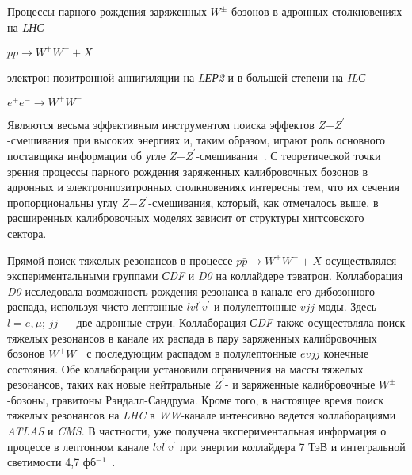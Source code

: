 Процессы парного рождения заряженных $W^±$-бозонов в адронных столкновениях на \textit{LНС}
\begin{center}
	$pp \rightarrow W^+W^- + X$
\end{center}
электрон-позитронной аннигиляции на \textit{LЕР2} и в большей степени на \textit{ILС}
\begin{center}
	$e^+e^- \rightarrow W^+W^-$
\end{center}

Являются весьма эффективным инструментом поиска эффектов $Z$−$Z^\prime$-смешивания при высоких энергиях и, таким образом, играют роль основного поставщика информации об угле $Z$−$Z^\prime$-смешивания~\cite{Bobovnikov:2016}. С теоретической точки зрения процессы парного рождения заряженных калибровочных бозонов в адронных и электронпозитронных столкновениях интересны тем, что их сечения пропорциональны углу $Z$−$Z^\prime$-смешивания, который, как отмечалось выше, в расширенных калибровочных моделях зависит от структуры хиггсовского сектора.

Прямой поиск тяжелых резонансов в процессе $p\bar{p} \rightarrow W^+W^- + X$ осуществлялся экспериментальными группами \textit{СDF} и \textit{D0} на коллайдере тэватрон. Коллаборация \textit{D0} исследовала возможность рождения резонанса в канале его дибозонного распада, используя чисто лептонные $lvl^\prime v^\prime$ и полулептонные $vjj$ моды. Здесь $l=e,\mu$; $jj$ — две адронные струи. Коллаборация \textit{СDF} также осуществляла поиск тяжелых резонансов в канале их распада в пару заряженных калибровочных бозонов $W^+W^−$ с последующим распадом в полулептонные $evjj$ конечные состояния. Обе коллаборации установили ограничения на массы тяжелых резонансов, таких как новые нейтральные $Z^\prime$- и заряженные калибровочные $W^±$-бозоны, гравитоны Рэндалл-Сандрума. Кроме того, в настоящее время поиск тяжелых резонансов на \textit{LHC} в \textit{WW}-канале интенсивно ведется коллаборациями \textit{ATLAS} и \textit{CMS}. В частности, уже получена экспериментальная информация о процессе в лептонном канале $lvl^\prime v^\prime$ при энергии коллайдера 7 ТэВ и интегральной светимости 4,7 фб${}^{−1}$~\cite{2part-pankov}.

